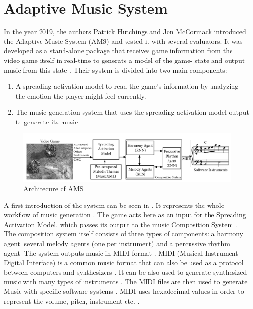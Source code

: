 \section{Adaptive Music System}
\label{sec:ams}

In the year 2019, the authors Patrick Hutchings and Jon McCormack
introduced the Adaptive Music System (AMS) \cite{hutMcCormAms} 
and tested it with several evaluators. It was developed as a
stand-alone package that receives game information from the
video game itself in real-time to generate a model of the game-
state and output music from this state \cite{hutMcCormAms}.
Their system is divided into two main components: 
\begin{enumerate}[label=\arabic*)]
    \item A spreading activation model to read the game's information by
analyzing the emotion the player might feel currently\cite{hutMcCormAms}.
    \item The music generation system that uses the spreading activation model output to generate its music \cite{hutMcCormAms}. 
\end{enumerate}
\begin{figure}[h]
    \centering
    \includegraphics[width=\linewidth]{images/ams_architecture.png}
    \caption{Architecure of AMS \cite{hutMcCormAms}}
    \label{fig:ams_architecture}
\end{figure}
A first introduction of the system can be seen in .
It represents the whole workflow of music generation \cite{hutMcCormAms}. The game 
acts here as an input for the Spreading Activation Model, which passes its output
to the music Composition System \cite{hutMcCormAms}. The composition system itself consists 
of three types of components: a harmony agent, several melody agents (one per instrument)
and a percussive rhythm agent. The system outputs music in
MIDI format \cite{hutMcCormAms}. MIDI (Musical Instrument Digital Interface) is a
common music format \cite{midi_explanation} that can also be used as a protocol
between computers and synthesizers \cite{midi_explanation}. It can be also used to 
generate synthesized music \cite{midi_explanation} with many types of instruments \cite{midi_general}.
The MIDI files are then used to generate Music with specific software systems \cite{hutMcCormAms}. MIDI uses hexadecimal values in order
to represent the volume, pitch, instrument etc. \cite{midi_general}\cite{midi_explanation}.

